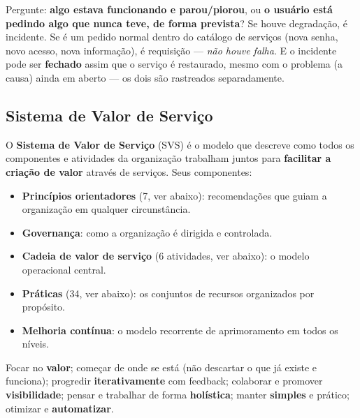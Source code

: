 \begin{regrapratica}
Pergunte: \textbf{algo estava funcionando e parou/piorou}, ou \textbf{o
usuário está pedindo algo que nunca teve, de forma prevista}? Se houve
degradação, é incidente. Se é um pedido normal dentro do catálogo de
serviços (nova senha, novo acesso, nova informação), é requisição --- \emph{
não houve falha}. E o incidente pode ser \textbf{fechado} assim que o
serviço é restaurado, mesmo com o problema (a causa) ainda em aberto --- os
dois são rastreados separadamente.
\end{regrapratica}

\subsection{Sistema de Valor de Serviço}

\begin{conceito}
O \textbf{Sistema de Valor de Serviço} (SVS) é o modelo que descreve como
todos os componentes e atividades da organização trabalham juntos para
\textbf{facilitar a criação de valor} através de serviços. Seus componentes:

\begin{itemize}
\item \textbf{Princípios orientadores} (7, ver abaixo): recomendações que
guiam a organização em qualquer circunstância.
\item \textbf{Governança}: como a organização é dirigida e controlada.
\item \textbf{Cadeia de valor de serviço} (6 atividades, ver abaixo): o
modelo operacional central.
\item \textbf{Práticas} (34, ver abaixo): os conjuntos de recursos
organizados por propósito.
\item \textbf{Melhoria contínua}: o modelo recorrente de aprimoramento em
todos os níveis.
\end{itemize}
\end{conceito}

\begin{conceito}
Focar no \textbf{valor}; começar de onde se está (não descartar o que já
existe e funciona); progredir \textbf{iterativamente} com feedback;
colaborar e promover \textbf{visibilidade}; pensar e trabalhar de forma
\textbf{holística}; manter \textbf{simples} e prático; otimizar e
\textbf{automatizar}.
\end{conceito}

